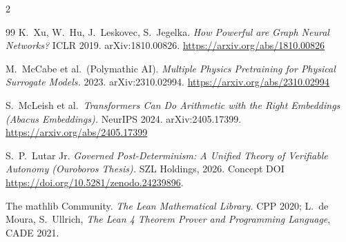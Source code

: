 \documentclass[11pt,letterpaper]{article}
\theoremstyle{definition}
\begin{document}
\begin{multicols}{2}
\begin{thebibliography}{99}
 K.\ Xu, W.\ Hu, J.\ Leskovec, S.\ Jegelka. \emph{How
Powerful are Graph Neural Networks?} ICLR 2019. arXiv:1810.00826.
\url{https://arxiv.org/abs/1810.00826}

 M.\ McCabe et al.\ (Polymathic AI).
\emph{Multiple Physics Pretraining for Physical Surrogate Models.} 2023.
arXiv:2310.02994. \url{https://arxiv.org/abs/2310.02994}

 S.\ McLeish et al.\ \emph{Transformers Can Do
Arithmetic with the Right Embeddings (Abacus Embeddings).} NeurIPS 2024.
arXiv:2405.17399. \url{https://arxiv.org/abs/2405.17399}

 S.\ P.\ Lutar Jr. \emph{Governed Post-Determinism: A
Unified Theory of Verifiable Autonomy (Ouroboros Thesis).} SZL Holdings, 2026.
Concept DOI \url{https://doi.org/10.5281/zenodo.24239896}.

 The mathlib Community. \emph{The Lean Mathematical Library.}
CPP 2020; L.\ de Moura, S.\ Ullrich, \emph{The Lean 4 Theorem Prover and
Programming Language}, CADE 2021.

\end{thebibliography}
\end{multicols}
\end{document}
